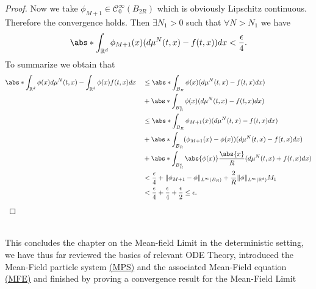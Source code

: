 \begin{proof}
  Now we take $\phi_{M+1} \in  \mathcal{C}_0^{\infty}(B_{2R}) $ which is obviously Lipschitz continuous. Therefore the convergence 
  holds. Then $\exists N_{1}>0$ such that $\forall  N > N_{1}$ we have 
  \begin{align*}
    \abs*{\int_{\mathbb{R}^{d} }\phi_{M+1}(x)(d\mu ^{N}(t,x) - f(t,x) )dx}< \frac{\epsilon}{4}
  .\end{align*}
  To summarize we obtain that 
  \begin{alignat*}{3}
    &\abs*{\int_{\mathbb{R}^{d} }\phi(x) d\mu ^{N}(t,x) - \int_{\mathbb{R}^{d} }\phi(x) f(t,x) dx} &&\le \abs*{\int_{B_R }\phi(x)(d\mu ^{N}(t,x) - f(t,x)dx ) } \\
    & &&+\abs*{\int_{B_R^{c} } \phi(x)(d\mu ^{N}(t,x)-f(t,x)dx )}\\
    & &&\le \abs*{\int_{B_R }\phi_{M+1}(x)(d\mu ^{N}(t,x) - f(t,x)dx ) } \\
    & &&+ \abs*{\int_{B_R} (\phi_{M+1}(x)-\phi(x))(d\mu ^{N}(t,x)-f(t,x)dx )}\\
    & &&+ \abs*{\int_{B^{c}_R }\abs{\phi(x)} \frac{\abs{x}}{R}(d\mu ^{N}(t,x) + f(t,x) dx)}\\
    & &&< \frac{\epsilon}{4} + \|\phi_{M+1}-\phi \|_{L^{\infty}(B_R) } + \frac{2}{R}\|\phi \|_{L^{\infty}(\mathbb{R}^{d} ) }M_1\\
    & &&< \frac{\epsilon}{4} +\frac{\epsilon}{4} +\frac{\epsilon}{2} \le \epsilon
  .\end{alignat*}
\end{proof}
\hspace{0mm}\\[3ex]
This concludes the chapter on the Mean-field Limit in the deterministic setting, we have thus far 
reviewed the basics of relevant ODE Theory, introduced the Mean-Field particle system \hyperref[first_order_system]{(MPS)} and the 
associated Mean-Field equation \hyperref[mfe]{(MFE)} and finished by proving a convergence
result for the Mean-Field Limit

